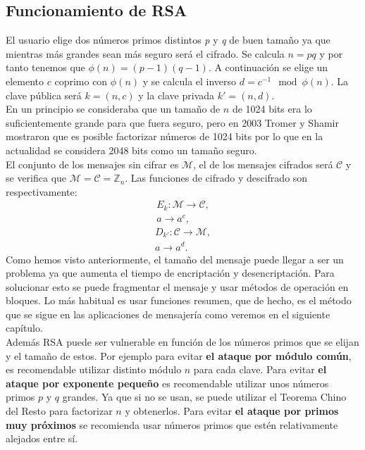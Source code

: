 \subsection{Funcionamiento de RSA}
El usuario elige dos números primos distintos \emph{p} y \emph{q} de buen tamaño ya que mientras más grandes sean más seguro será el cifrado.
Se calcula $n = pq$ y por tanto tenemos que $\phi(n) = (p-1)(q-1)$. A continuación se elige un elemento $c$ coprimo con $\phi(n)$ y se calcula el inverso $d = c^{-1}\mod \phi(n)$. La clave pública será $k=(n,c)$ y la clave privada $k'=(n,d)$.\\
En un principio se consideraba que un tamaño de $n$ de 1024 bits era lo suficientemente grande para que fuera seguro, pero en 2003 Tromer y Shamir mostraron que es posible factorizar números de 1024 bits \cite{1024RSA} por lo que en la actualidad se considera 2048 bits como un tamaño seguro.\\
El conjunto de los mensajes sin cifrar es $\mathcal{M}$, el de los mensajes cifrados será $\mathcal{C}$ y se verifica que $\mathcal{M} = \mathcal{C} = \mathbb{Z}_n$. Las funciones de cifrado y descifrado son respectivamente:
\begin{align*}
	E_{k}:\mathcal{M}\rightarrow\mathcal{C},\\
	a \rightarrow a^c,
\end{align*}
\begin{align*}
	D_{k'}:\mathcal{C}\rightarrow\mathcal{M},\\
	a \rightarrow a^d.
\end{align*}
Como hemos visto anteriormente, el tamaño del mensaje puede llegar a ser un problema ya que aumenta el tiempo de encriptación y desencriptación. Para solucionar esto se puede fragmentar el mensaje y usar métodos de operación en bloques. Lo más habitual es usar funciones resumen, que de hecho, es el método que se sigue en las aplicaciones de mensajería como veremos en el siguiente capítulo.\\
Además RSA puede ser vulnerable en función de los números primos que se elijan y el tamaño de estos. 
Por ejemplo para evitar \textbf{el ataque por módulo común}, es recomendable utilizar distinto módulo $n$ para cada clave. 
Para evitar \textbf{el ataque por exponente pequeño} es recomendable utilizar unos números primos $p$ y $q$ grandes. Ya que si no se usan, se puede utilizar el Teorema Chino del Resto para factorizar $n$ y obtenerlos. 
Para evitar \textbf{el ataque por primos muy próximos} se recomienda usar números primos que estén relativamente alejados entre sí. 

